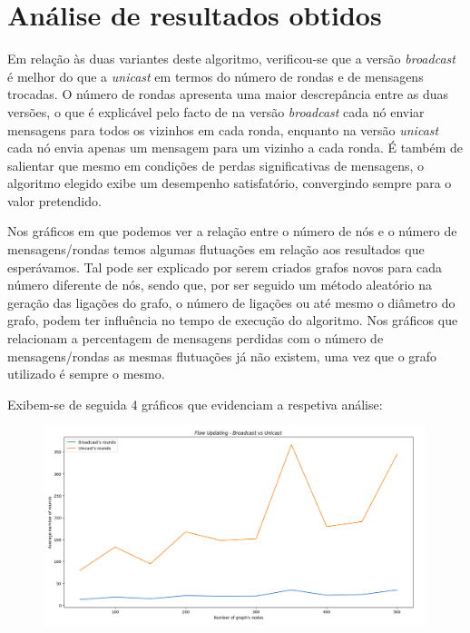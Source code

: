\documentclass[a4paper]{report}
\begin{document}
{\let\clearpage\relax \chapter{Análise de resultados obtidos} \label{ch:Analysis of results}}
\large{
	Em relação às duas variantes deste algoritmo, verificou-se que a versão \textit{broadcast} é melhor do que a \textit{unicast} em termos do número de rondas e de mensagens trocadas.
	O número de rondas apresenta uma maior descrepância entre as duas versões, o que é explicável pelo facto de na versão \textit{broadcast} cada nó enviar mensagens para todos os vizinhos em cada ronda, 
	enquanto na versão \textit{unicast} cada nó envia apenas um mensagem para um vizinho a cada ronda.	
	É também de salientar que mesmo em condições de perdas significativas de mensagens, o algoritmo elegido exibe um desempenho satisfatório, convergindo sempre para o valor pretendido.

	Nos gráficos em que podemos ver a relação entre o número de nós e o número de mensagens/rondas temos algumas flutuações em relação aos resultados que esperávamos.
	Tal pode ser explicado por serem criados grafos novos para cada número diferente de nós, sendo que, por ser seguido um método aleatório na geração das ligações do grafo, 
	o número de ligações ou até mesmo o diâmetro do grafo, podem ter influência no tempo de execução do algoritmo.
	Nos gráficos que relacionam a percentagem de mensagens perdidas com o número de mensagens/rondas as mesmas flutuações já não existem, uma vez que o grafo utilizado é sempre o mesmo.

	Exibem-se de seguida 4 gráficos que evidenciam a respetiva análise:
	\begin{figure}[H]
		\centering
		\includegraphics[width=0.99\textwidth]{Images/Plot1.png}
		\label{fig:1}
	\end{figure}
	
}
\end{document}
